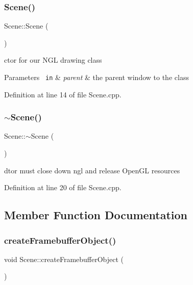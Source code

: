 \subsubsection{Scene()}
{\footnotesize\ttfamily Scene\+::\+Scene (\begin{DoxyParamCaption}{ }\end{DoxyParamCaption})}



ctor for our N\+GL drawing class 


\begin{DoxyParams}[1]{Parameters}
\mbox{\texttt{ in}}  & {\em parent} & the parent window to the class \\
\hline
\end{DoxyParams}


Definition at line 14 of file Scene.\+cpp.

\mbox{\label{class_scene_a9990bde99d4f00742ed4de308bf194ae}} 
\subsubsection{$\sim$Scene()}
{\footnotesize\ttfamily Scene\+::$\sim$\+Scene (\begin{DoxyParamCaption}{ }\end{DoxyParamCaption})\hspace{0.3cm}{\ttfamily [override]}}



dtor must close down ngl and release Open\+GL resources 



Definition at line 20 of file Scene.\+cpp.



\subsection{Member Function Documentation}
\mbox{\label{class_scene_aaa91c996597f3da3cb1ca2c1d6bb2159}} 
\subsubsection{createFramebufferObject()}
{\footnotesize\ttfamily void Scene\+::create\+Framebuffer\+Object (\begin{DoxyParamCaption}{ }\end{DoxyParamCaption})\hspace{0.3cm}{\ttfamily [private]}}




